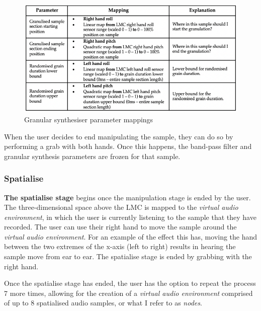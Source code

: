 \begin{figure}
    \centering
    \includegraphics[width=0.8\linewidth]{figures/c_5/areatechnical_param2.png}
    \caption{Granular synthesiser parameter mappings}
    \label{fig: areaparams2}
\end{figure}
When the user decides to end manipulating the sample, they can do so by performing a grab with both hands. Once this happens, the band-pass filter and granular synthesis parameters are frozen for that sample.

\subsubsection{Spatialise}                      \label{sec: area-system-software-spatialise}
\textbf{The spatialise stage} begins once the manipulation stage is ended by the user. The three-dimensional space above the LMC is mapped to the \textit{virtual audio environment}, in which the user is currently listening to the sample that they have recorded. The user can use their right hand to move the sample around the \textit{virtual audio environment}. For an example of the effect this has, moving the hand between the two extremes of the x-axis (left to right) results in hearing the sample move from ear to ear. The spatialise stage is ended by grabbing with the right hand.

Once the spatialise stage has ended, the user has the option to repeat the process 7 more times, allowing for the creation of a \textit{virtual audio environment} comprised of up to 8 spatialised audio samples, or what I refer to as \textit{nodes}. 


